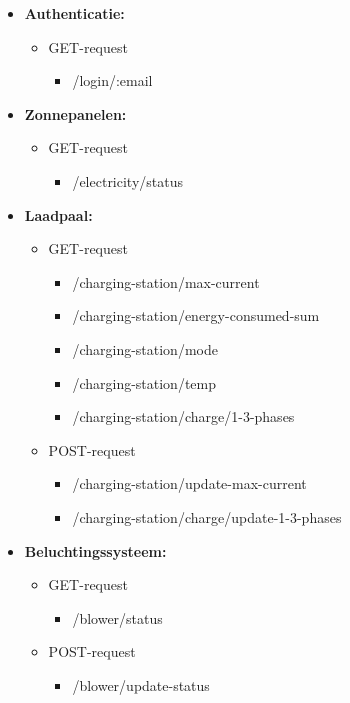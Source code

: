 \begin{itemize}
    \item \textbf{Authenticatie:} \label{list:api-endpoints}
          \begin{itemize}
              \item GET-request
                    \begin{itemize}
                        \item /login/:email
                    \end{itemize}
          \end{itemize}
    \item \textbf{Zonnepanelen:}
          \begin{itemize}
              \item GET-request
                    \begin{itemize}
                        \item /electricity/status
                    \end{itemize}
          \end{itemize}
    \item \textbf{Laadpaal:}
          \begin{itemize}
              \item GET-request
                    \begin{itemize}
                        \item /charging-station/max-current
                        \item /charging-station/energy-consumed-sum
                        \item /charging-station/mode
                        \item /charging-station/temp
                        \item /charging-station/charge/1-3-phases
                    \end{itemize}
              \item POST-request
                    \begin{itemize}
                        \item /charging-station/update-max-current
                        \item /charging-station/charge/update-1-3-phases
                    \end{itemize}
          \end{itemize}
    \item \textbf{Beluchtingssysteem:}
          \begin{itemize}
              \item GET-request
                    \begin{itemize}
                        \item /blower/status
                    \end{itemize}
              \item POST-request
                    \begin{itemize}
                        \item /blower/update-status
                    \end{itemize}
          \end{itemize}
\end{itemize}

